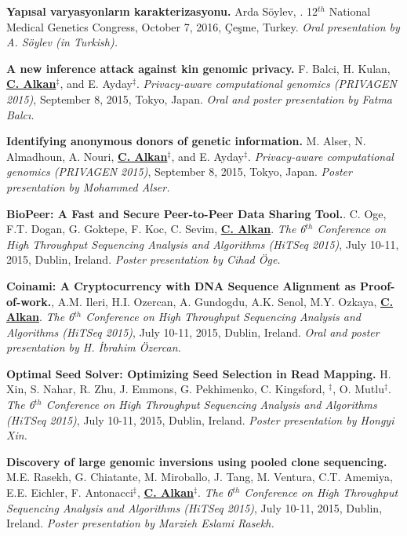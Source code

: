 \vspace{-.2cm}
       {\bf Yapısal varyasyonların karakterizasyonu.} Arda Söylev, \calkan{}. 12$^{th}$ National Medical Genetics Congress, October 7, 2016, Çeşme, Turkey.
       {\it Oral presentation by A. Söylev (in Turkish).}
       
\vspace{-.2cm}
{\bf  A new inference attack against kin genomic privacy.}
F. Balci, H. Kulan, {\bf {\underline{C. Alkan}}}$^\ddag$, and E. Ayday$^\ddag$. 
{\em Privacy-aware computational genomics (PRIVAGEN 2015)}, 
 September 8, 2015, Tokyo, Japan. {\it Oral and poster presentation by Fatma Balcı.}

\vspace{-.2cm}
{\bf Identifying anonymous donors of genetic information.}
M. Alser, N. Almadhoun, A. Nouri, {\bf {\underline{C. Alkan}}}$^\ddag$, and E. Ayday$^\ddag$. 
{\em Privacy-aware computational genomics (PRIVAGEN 2015)}, 
 September 8, 2015, Tokyo, Japan. {\it Poster presentation by Mohammed Alser.}

\vspace{-.2cm}
 {\bf BioPeer: A Fast and Secure Peer-to-Peer Data Sharing Tool.}.
  C. Oge, F.T. Dogan, G. Goktepe, F. Koc, C. Sevim, {\bf {\underline{C. Alkan}}}.
{\em The 6$^{th}$ Conference on High Throughput Sequencing Analysis and Algorithms (HiTSeq 2015)}, 
July 10-11, 2015, Dublin, Ireland. {\it Poster presentation by Cihad Öge.}

\vspace{-.2cm}
 {\bf Coinami: A Cryptocurrency with DNA Sequence Alignment as Proof-of-work.},
  A.M. Ileri, H.I. Ozercan, A. Gundogdu, A.K. Senol, M.Y. Ozkaya, {\bf {\underline{C. Alkan}}}.
{\em The 6$^{th}$ Conference on High Throughput Sequencing Analysis and Algorithms (HiTSeq 2015)}, 
July 10-11, 2015, Dublin, Ireland. {\it Oral and poster presentation by H. İbrahim Özercan.}



\vspace{-.2cm}        
       {\bf Optimal Seed Solver: Optimizing Seed Selection in Read Mapping.}
       H. Xin, S. Nahar, R. Zhu, J. Emmons, G. Pekhimenko, C. Kingsford, \calkan{}$^\ddag$, O. Mutlu$^\ddag$.
{\em The 6$^{th}$ Conference on High Throughput Sequencing Analysis and Algorithms (HiTSeq 2015)}, 
July 10-11, 2015, Dublin, Ireland. {\it Poster presentation by Hongyi Xin.}

\vspace{-.2cm}
{\bf Discovery of large genomic inversions using pooled clone sequencing.}
M.E. Rasekh, G. Chiatante, M. Miroballo, J. Tang, M. Ventura, C.T. Amemiya, E.E. Eichler, F. Antonacci$^\ddag$, {\bf {\underline{C. Alkan}}}$^\ddag$.
{\em The 6$^{th}$ Conference on High Throughput Sequencing Analysis and Algorithms (HiTSeq 2015)}, 
July 10-11, 2015, Dublin, Ireland. {\it Poster presentation by Marzieh Eslami Rasekh.}



